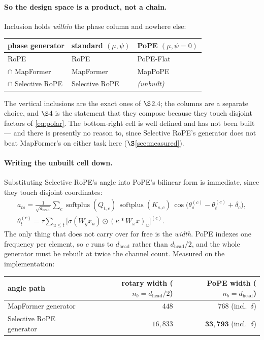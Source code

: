 \documentclass[11pt]{article}
\newcommand{\hd}{d_{\mathrm{head}}}
\newcommand{\nb}{n_b}
\DeclareMathOperator{\softplus}{softplus}
\begin{document}
\paragraph{So the design space is a product, not a chain.} Inclusion holds
\emph{within} the phase column and nowhere else:
\begin{center}\small
\begin{tabular}{lll}
\toprule
phase generator & standard $(\mu,\psi)$ & PoPE $(\mu,\psi{=}0)$ \\
\midrule
RoPE            & RoPE            & PoPE-Flat \\
$\cap$ \; MapFormer & MapFormer   & MapPoPE \\
$\cap$ \; Selective RoPE & Selective RoPE & \emph{(unbuilt)} \\
\bottomrule
\end{tabular}
\end{center}
The vertical inclusions are the exact ones of $\S$2.4; the columns are a separate
choice, and $\S$4 is the statement that they compose because they touch disjoint
factors of \eqref{eq:polar}. The bottom-right cell is well defined and has not
been built --- and there is presently no reason to, since Selective RoPE's
generator does not beat MapFormer's on either task here ($\S$\ref{sec:measured}).

\paragraph{Writing the unbuilt cell down.} Substituting Selective RoPE's angle
into PoPE's bilinear form is immediate, since they touch disjoint coordinates:
\begin{equation}
  \label{eq:sropepope}
  \begin{gathered}
  a_{ts} = \frac{1}{\sqrt{\hd}}\sum_{c}
    \softplus(Q_{t,c})\,\softplus(K_{s,c})\,
    \cos\!\Big(\theta^{(c)}_s - \theta^{(c)}_t + \delta_c\Big),\\[2pt]
  \theta^{(c)}_t = \tau\!\!\sum_{u\le t}\!\big[\sigma(W_gx_u)\odot(\kappa*W_\omega x)_u\big]^{(c)}.
  \end{gathered}
\end{equation}
The only thing that does not carry over for free is the \emph{width}. PoPE indexes
one frequency per element, so $c$ runs to $\hd$ rather than $\hd/2$, and the whole
generator must be rebuilt at twice the channel count. Measured on the
implementation:

\begin{center}\small
\begin{tabular}{lrr}
\toprule
angle path & rotary width ($\nb = \hd/2$) & PoPE width ($\nb = \hd$) \\
\midrule
MapFormer generator      & $448$    & $768$ (incl.\ $\delta$) \\
Selective RoPE generator & $16{,}833$ & $\mathbf{33{,}793}$ (incl.\ $\delta$) \\
\bottomrule
\end{tabular}
\end{center}
\end{document}

